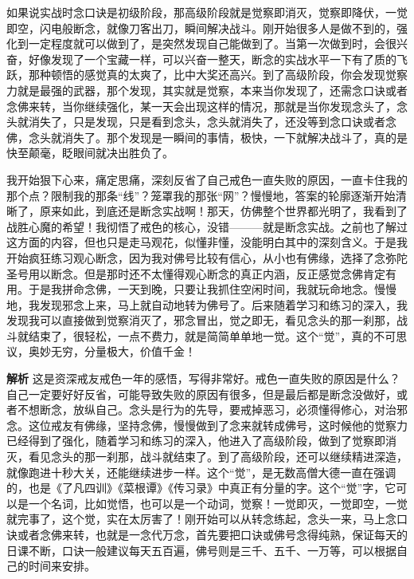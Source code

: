 如果说实战时念口诀是初级阶段，那高级阶段就是觉察即消灭，觉察即降伏，一觉即空，闪电般断念，就像刀客出刀，瞬间解决战斗。刚开始很多人是做不到的，强化到一定程度就可以做到了，是突然发现自己能做到了。当第一次做到时，会很兴奋，好像发现了一个宝藏一样，可以兴奋一整天，断念的实战水平一下有了质的飞跃，那种顿悟的感觉真的太爽了，比中大奖还高兴。到了高级阶段，你会发现觉察力就是最强的武器，那个发现，其实就是觉察，本来当你发现了，还需念口诀或者念佛来转，当你继续强化，某一天会出现这样的情况，那就是当你发现念头了，念头就消失了，只是发现，只是看到念头，念头就消失了，还没等到念口诀或者念佛，念头就消失了。那个发现是一瞬间的事情，极快，一下就解决战斗了，真的是快至颠毫，眨眼间就决出胜负了。

\begin{case}[直接觉察消灭]
    我开始狠下心来，痛定思痛，深刻反省了自己戒色一直失败的原因，一直卡住我的那个点？限制我的那条“线”？笼罩我的那张“网”？慢慢地，答案的轮廓逐渐开始清晰了，原来如此，到底还是断念实战啊！那天，仿佛整个世界都光明了，我看到了战胜心魔的希望！我彻悟了戒色的核心，没错———就是断念实战。之前也了解过这方面的内容，但也只是走马观花，似懂非懂，没能明白其中的深刻含义。于是我开始疯狂练习观心断念，因为我对佛号比较有信心，从小也有佛缘，选择了念弥陀圣号用以断念。但是那时还不太懂得观心断念的真正内涵，反正感觉念佛肯定有用。于是我拼命念佛，一天到晚，只要让我抓住空闲时间，我就玩命地念。慢慢地，我发现邪念上来，马上就自动地转为佛号了。后来随着学习和练习的深入，我发现我可以直接做到觉察消灭了，邪念冒出，觉之即无，看见念头的那一刹那，战斗就结束了，很轻松，一点不费力，就是简简单单地一觉。这个“觉”，真的不可思议，奥妙无穷，分量极大，价值千金！

    \textbf{解析} 这是资深戒友戒色一年的感悟，写得非常好。戒色一直失败的原因是什么？自己一定要好好反省，可能导致失败的原因有很多，但是最后都是断念没做好，或者不想断念，放纵自己。念头是行为的先导，要戒掉恶习，必须懂得修心，对治邪念。这位戒友有佛缘，坚持念佛，慢慢做到了念来就转成佛号，这时候他的觉察力已经得到了强化，随着学习和练习的深入，他进入了高级阶段，做到了觉察即消灭，看见念头的那一刹那，战斗就结束了。到了高级阶段，还可以继续精进深造，就像跑进十秒大关，还能继续进步一样。这个“觉”，是无数高僧大德一直在强调的，也是《了凡四训》《菜根谭》《传习录》中真正有分量的字。这个“觉”字，它可以是一个名词，比如觉悟，也可以是一个动词，觉察！一觉即灭，一觉即空，一觉就完事了，这个觉，实在太厉害了！刚开始可以从转念练起，念头一来，马上念口诀或者念佛来转，也就是一念代万念，首先要把口诀或佛号念得纯熟，保证每天的日课不断，口诀一般建议每天五百遍，佛号则是三千、五千、一万等，可以根据自己的时间来安排。
\end{case}

